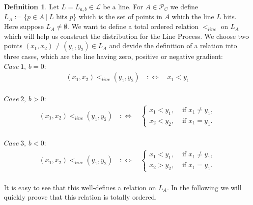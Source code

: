 \documentclass[12pt,a4paper]{scrartcl}
\numberwithin{equation}{section}
\numberwithin{equation}{section}%
\theoremstyle{definition}
\newtheorem{definition}[theorem]{Definition}
\theoremstyle{definition}
\begin{document}
\begin{definition}
	Let $L=L_{a,b}\in \mathcal{L}$ be a line. For $A\in \mathcal{P}_C$ we define $L_{A} := \{ p\in A\ |\ L \text{ hits } p\}$ which is the set of points in $A$ which the line $L$ hits. Here suppose $L_A \neq \emptyset$. We want to define a total ordered relation $<_{line}$ on $L_A$ which will help us construct the distribution for the Line Process. We choose two points $(x_1,x_2)\neq(y_1,y_2)\in L_A$ and devide the definition of a relation into three cases, which are the line having zero, positive or negative gradient: \\
	$\mathit{Case\ 1,\ b=0}$:
	\begin{align*}
	(x_1, x_2) <_{line} (y_1, y_2) \quad :\Leftrightarrow \quad x_1 < y_1
	\end{align*}\\
	$\mathit{Case\ 2,\ b>0}$:
	\begin{align*}
	(x_1, x_2) <_{line} (y_1, y_2) \quad :\Leftrightarrow \quad
		\begin{cases}
			x_1 < y_1, & \text{ if } x_1 \neq y_1, \\
			x_2 < y_2, & \text{ if } x_1 = y_1.
		\end{cases}
	\end{align*}\\
	$\mathit{Case\ 3,\ b<0}$:
	\begin{align*}
	(x_1, x_2) <_{line} (y_1, y_2) \quad :\Leftrightarrow \quad
	\begin{cases}
	x_1 < y_1, & \text{ if } x_1 \neq y_1, \\
	x_2 > y_2, & \text{ if } x_1 = y_1.
	\end{cases}
	\end{align*}\\
	It is easy to see that this well-defines a relation on $L_A$. In the following we will quickly proove that this relation is totally ordered. 
\end{definition}
\end{document}
